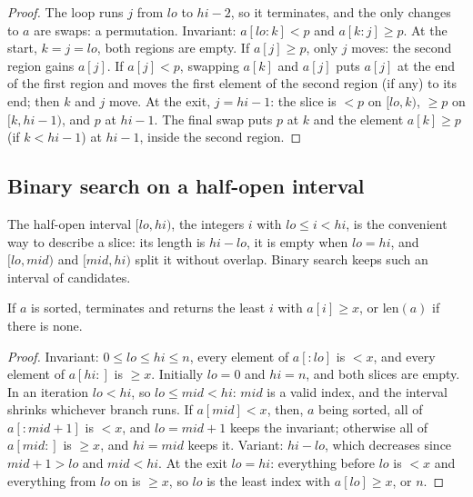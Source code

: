 \begin{proof}
The loop runs $j$ from $lo$ to $hi - 2$, so it terminates, and the only changes to $a$ are swaps: a permutation.
Invariant: $a[lo{:}k] < p$ and $a[k{:}j] \geq p$. At the start, $k = j = lo$, both regions are empty. If $a[j] \geq p$,
only $j$ moves: the second region gains $a[j]$. If $a[j] < p$, swapping $a[k]$ and $a[j]$ puts $a[j]$ at the end of the
first region and moves the first element of the second region (if any) to its end; then $k$ and $j$ move. At the exit,
$j = hi - 1$: the slice is $< p$ on $[lo, k)$, $\geq p$ on $[k, hi - 1)$, and $p$ at $hi - 1$. The final swap puts $p$ at
$k$ and the element $a[k] \geq p$ (if $k < hi - 1$) at $hi - 1$, inside the second region.
\end{proof}

\subsection*{Binary search on a half-open interval}

The half-open interval $[lo, hi)$, the integers $i$ with $lo \leq i < hi$, is the convenient way to describe a slice:
its length is $hi - lo$, it is empty when $lo = hi$, and $[lo, mid)$ and $[mid, hi)$ split it without overlap. Binary
search keeps such an interval of candidates.

\omcode{code/bachelor-1/12-program-correctness/listings/bsearch.py}{4}{15}{The leftmost position of $x$, on
$[lo, hi)$}\label{lst:b1:program-correctness:bsearch}

\label{out:b1:program-correctness:bsearch}

\begin{proposition}\label{prop:b1:program-correctness:bsearch}
If $a$ is sorted,  terminates and returns the least $i$ with $a[i] \geq x$, or $\text{len}(a)$ if
there is none.
\end{proposition}

\begin{proof}
Invariant: $0 \leq lo \leq hi \leq n$, every element of $a[{:}lo]$ is $< x$, and every element of $a[hi{:}]$ is $\geq
x$. Initially $lo = 0$ and $hi = n$, and both slices are empty. In an iteration $lo < hi$, so $lo \leq mid < hi$: $mid$
is a valid index, and the interval shrinks whichever branch runs. If $a[mid] < x$, then, $a$ being sorted, all of
$a[{:}mid + 1]$ is $< x$, and $lo = mid + 1$ keeps the invariant; otherwise all of $a[mid{:}]$ is $\geq x$, and $hi = mid$
keeps it. Variant: $hi - lo$, which decreases since $mid + 1 > lo$ and $mid < hi$. At the exit $lo = hi$: everything
before $lo$ is $< x$ and everything from $lo$ on is $\geq x$, so $lo$ is the least index with $a[lo] \geq x$, or $n$.
\end{proof}

